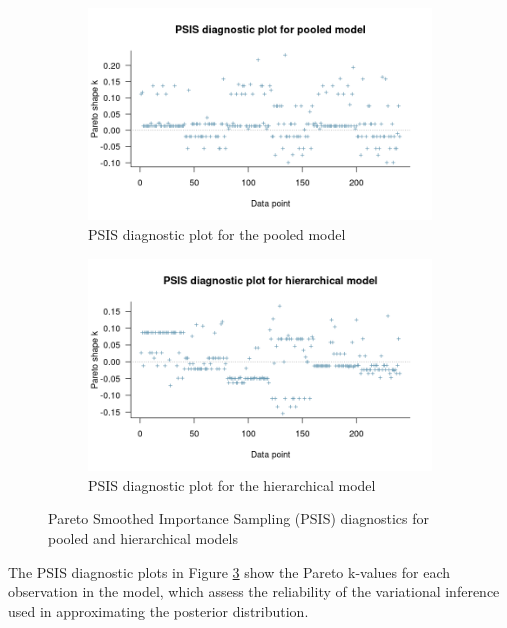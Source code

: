 \documentclass[a4paper]{artikel3}
\begin{document}
\begin{figure}[htbp]
  \centering
  \begin{subfigure}[b]{0.48\textwidth}
    \includegraphics[width=\textwidth]{psis_pooled.png}
    \caption{PSIS diagnostic plot for the pooled model}
    \label{fig:psis_pooled}
  \end{subfigure}
  \hfill %
  \begin{subfigure}[b]{0.48\textwidth}
    \includegraphics[width=\textwidth]{psis_hier.png}
    \caption{PSIS diagnostic plot for the hierarchical model}
    \label{fig:psis_hier}
  \end{subfigure}
  \caption{Pareto Smoothed Importance Sampling (PSIS) diagnostics for pooled and hierarchical models}
  \label{fig:both_psis}
\end{figure}

The PSIS diagnostic plots in Figure \ref{fig:both_psis} show the Pareto k-values for each observation in the model, which assess the reliability of the variational inference used in approximating the posterior distribution.
\end{document}
